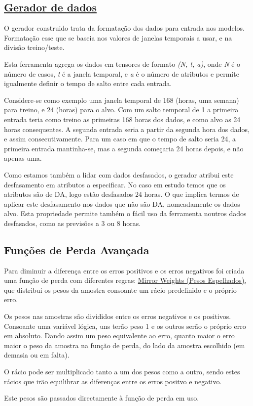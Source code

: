 \subsection{\href{https://github.com/alquimodelia/alquitable/blob/main/alquitable/generator.py}{Gerador de dados}}

O gerador construido trata da formatação dos dados para entrada nos modelos. Formatação esse que se baseia nos valores de janelas temporais a usar, e na divisão treino/teste.\par
Esta ferramenta agrega os dados em tensores de formato \textit{(N, t, a)}, onde \textit{N} é o número de casos, \textit{t} é a janela temporal, e \textit{a} é o número de atributos e permite igualmente definir o tempo de salto entre cada entrada.\par
Considere-se como exemplo uma janela temporal de 168 (horas, uma semana) para treino, e 24 (horas) para o alvo. Com um salto temporal de 1 a primeira entrada teria como treino as primeiras 168 horas dos dados, e como alvo as 24 horas consequentes. A segunda entrada seria a partir da segunda hora dos dados, e assim consecutivamente. Para um caso em que o tempo de salto seria 24, a primeira entrada mantinha-se, mas a segunda começaria 24 horas depois, e não apenas uma.\par

Como estamos também a lidar com dados desfasados, o gerador atribui este desfasamento em atributos a especificar. No caso em estudo temos que os atributos são de \gls{DA}, logo estão desfasados 24 horas. O que implica termos de aplicar este desfasamento nos dados que não são \gls{DA}, nomeadamente os dados alvo. Esta propriedade permite também o fácil uso da ferramenta noutros dados desfasados, como as previsões a 3 ou 8 horas.\par


\subsection{Funções de Perda Avançada \label{advanced_loss_expl}}

Para diminuir a diferença entre os erros positivos e os erros negativos foi criada uma função de perda com diferentes regras:
\href{https://github.com/alquimodelia/alquitable/blob/main/alquitable/advanced_losses.py#L33}{Mirror Weights (Pesos Espelhados)},
que distribui os pesos da amostra consoante um rácio predefinido e o próprio erro.\par
Os pesos nas amostras são divididos entre os erros negativos e os positivos. Consoante uma variável lógica, uns terão peso 1 e os outros serão o próprio erro em absoluto. Dando assim um peso equivalente ao erro, quanto maior o erro maior o peso da amostra na função de perda, do lado da amostra escolhido (em demasia ou em falta).\par
O rácio pode ser multiplicado tanto a um dos pesos como a outro, sendo estes rácios que irão equilibrar as diferenças entre os erros positvo e negativo.\par
Este pesos são passados directamente à função de perda em uso.\par


